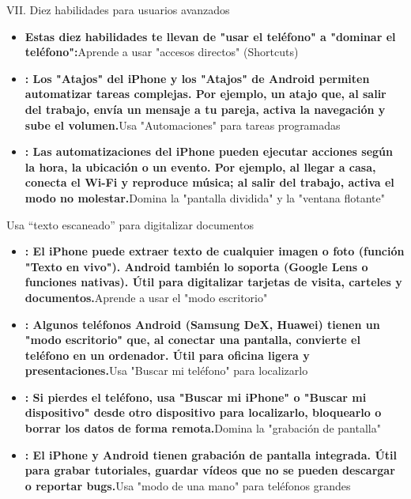 
VII. Diez habilidades para usuarios avanzados

\begin{itemize}
  \item \textbf{Estas diez habilidades te llevan de "usar el teléfono" a "dominar el teléfono":}Aprende a usar "accesos directos" (Shortcuts)
  \item \textbf{: Los "Atajos" del iPhone y los "Atajos" de Android permiten automatizar tareas complejas. Por ejemplo, un atajo que, al salir del trabajo, envía un mensaje a tu pareja, activa la navegación y sube el volumen.}Usa "Automaciones" para tareas programadas
  \item \textbf{: Las automatizaciones del iPhone pueden ejecutar acciones según la hora, la ubicación o un evento. Por ejemplo, al llegar a casa, conecta el Wi-Fi y reproduce música; al salir del trabajo, activa el modo no molestar.}Domina la "pantalla dividida" y la "ventana flotante"
\end{itemize}


Usa “texto escaneado” para digitalizar documentos

\begin{itemize}
  \item \textbf{: El iPhone puede extraer texto de cualquier imagen o foto (función "Texto en vivo"). Android también lo soporta (Google Lens o funciones nativas). Útil para digitalizar tarjetas de visita, carteles y documentos.}Aprende a usar el "modo escritorio"
  \item \textbf{: Algunos teléfonos Android (Samsung DeX, Huawei) tienen un "modo escritorio" que, al conectar una pantalla, convierte el teléfono en un ordenador. Útil para oficina ligera y presentaciones.}Usa "Buscar mi teléfono" para localizarlo
  \item \textbf{: Si pierdes el teléfono, usa "Buscar mi iPhone" o "Buscar mi dispositivo" desde otro dispositivo para localizarlo, bloquearlo o borrar los datos de forma remota.}Domina la "grabación de pantalla"
  \item \textbf{: El iPhone y Android tienen grabación de pantalla integrada. Útil para grabar tutoriales, guardar vídeos que no se pueden descargar o reportar bugs.}Usa "modo de una mano" para teléfonos grandes
\end{itemize}

